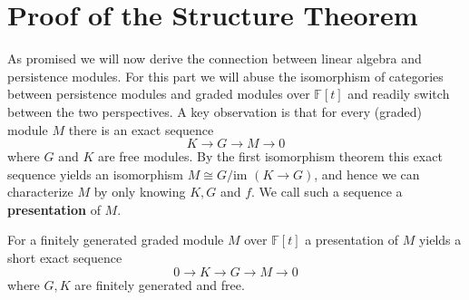 



\section{Proof of the Structure Theorem}
As promised we will now derive the connection between linear algebra and persistence modules. For this part we will abuse the isomorphism of categories between persistence modules and graded modules over $\mathbb{F}[t]$ and readily switch between the two perspectives.  A key observation is that for every (graded) module $M$ there is an exact sequence
\[ K \to G \to M \to 0\]
where $G$ and $K$ are free modules. By the first isomorphism theorem this exact sequence yields an isomorphism $M \cong G/\text{im }(K \to G)$, and hence we can characterize $M$ by only knowing $K,G$ and $f$. We call such a sequence a \textbf{presentation} of $M$.
\begin{lemma}
  For a finitely generated graded module $M$ over $\mathbb{F}[t]$ a presentation of $M$ yields a short exact sequence
  \[ 0 \to K \to G \to M \to 0\]
  where $G,K$ are finitely generated and free.
\end{lemma}
